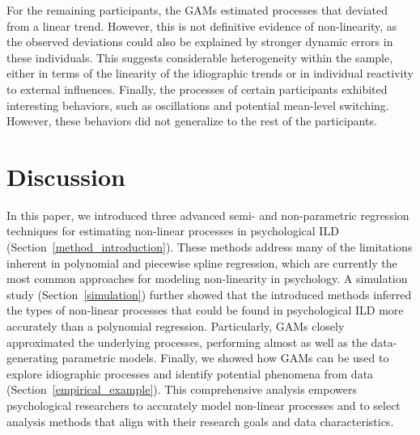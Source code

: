 \documentclass[man, floatsintext]{apa7}
\begin{document}
For the remaining participants, the GAMs estimated processes that deviated from
a linear trend. However, this is not definitive evidence of non-linearity, as
the observed deviations could also be explained by stronger dynamic errors in
these individuals. This suggests considerable heterogeneity within the sample,
either in terms of the linearity of the idiographic trends or in individual
reactivity to external influences. Finally, the processes of certain
participants exhibited interesting behaviors, such as oscillations and
potential mean-level switching. However, these behaviors did not generalize to
the rest of the participants.

\section{Discussion}

In this paper, we introduced three advanced semi- and non-parametric regression
techniques for estimating non-linear processes in psychological ILD
(Section~\ref{method_introduction}). These methods address many of the
limitations inherent in polynomial and piecewise spline regression, which are
currently the most common approaches for modeling non-linearity in psychology.
A simulation study (Section~\ref{simulation}) further showed that the
introduced methods inferred the types of non-linear processes that could be
found in psychological ILD more accurately than a polynomial regression.
Particularly, GAMs closely approximated the underlying processes, performing
almost as well as the data-generating parametric models. Finally, we showed how
GAMs can be used to explore idiographic processes and identify potential
phenomena from data (Section~\ref{empirical_example}). This comprehensive
analysis empowers psychological researchers to accurately model non-linear
processes and to select analysis methods that align with their research goals
and data characteristics.
\end{document}
